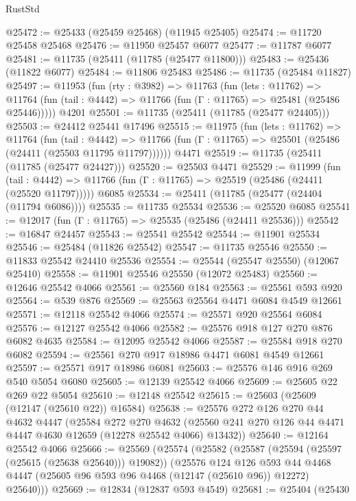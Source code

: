 \begin{lexlean}{RustStd}
\begin{coremodule}
@25472 := @25433 (@25459 @25468) (@11945 @25405)
@25474 := @11720 @25458 @25468
@25476 := @11950 @25457 @6077
@25477 := @11787 @6077
@25481 := @11735 (@25411 (@11785 (@25477 @11800)))
@25483 := @25436 (@11822 @6077)
@25484 := @11806 @25483
@25486 := @11735 (@25484 @11827)
@25497 := @11953
    (fun (rty : @3982) =>
    @11763
      (fun (lets : @11762) =>
      @11764 (fun (tail : @4442) => @11766 (fun (Γ : @11765) => @25481 (@25486 @25446)))))
    @4201
@25501 := @11735 (@25411 (@11785 (@25477 @24405)))
@25503 := @24412 @25441 @17496
@25515 := @11975
    (fun (lets : @11762) =>
    @11764
      (fun (tail : @4442) =>
      @11766 (fun (Γ : @11765) => @25501 (@25486 (@24411 (@25503 @11795 @11797))))))
    @4471
@25519 := @11735 (@25411 (@11785 (@25477 @24427)))
@25520 := @25503 @4471
@25529 := @11999
    (fun (tail : @4442) => @11766 (fun (Γ : @11765) => @25519 (@25486 (@24411 (@25520 @11797)))))
    @6085
@25534 := @25411 (@11785 (@25477 (@24404 (@11794 @6086))))
@25535 := @11735 @25534
@25536 := @25520 @6085
@25541 := @12017 (fun (Γ : @11765) => @25535 (@25486 (@24411 @25536)))
@25542 := @16847 @24457
@25543 := @25541 @25542
@25544 := @11901 @25534
@25546 := @25484 (@11826 @25542)
@25547 := @11735 @25546
@25550 := @11833 @25542 @24410 @25536
@25554 := @25544 (@25547 @25550) (@12067 @25410)
@25558 := @11901 @25546 @25550 (@12072 @25483)
@25560 := @12646 @25542 @4066
@25561 := @25560 @184
@25563 := @25561 @593 @920
@25564 := @539 @876
@25569 := @25563 @25564 @4471 @6084 @4549 @12661
@25571 := @12118 @25542 @4066
@25574 := @25571 @920 @25564 @6084
@25576 := @12127 @25542 @4066
@25582 := @25576 @918 @127 @270 @876 @6082 @4635
@25584 := @12095 @25542 @4066
@25587 := @25584 @918 @270 @6082
@25594 := @25561 @270 @917 @18986 @4471 @6081 @4549 @12661
@25597 := @25571 @917 @18986 @6081
@25603 := @25576 @146 @916 @269 @540 @5054 @6080
@25605 := @12139 @25542 @4066
@25609 := @25605 @22 @269 @22 @5054
@25610 := @12148 @25542
@25615 := @25603 (@25609 (@12147 (@25610 @22)) @16584)
@25638 := @25576
    @272
    @126
    @270
    @44
    @4632
    @4447
    (@25584
      @272
      @270
      @4632
      (@25560 @241 @270 @126 @44 @4471 @4447 @4630 @12659 (@12278 @25542 @4066) @13432))
@25640 := @12164 @25542 @4066
@25666 := @25569
    (@25574
      (@25582
        (@25587 (@25594 (@25597 (@25615 (@25638 @25640))) @19082))
        (@25576
          @124
          @126
          @593
          @44
          @4468
          @4447
          (@25605 @96 @593 @96 @4468 (@12147 (@25610 @96)) @12272)
          @25640)))
@25669 := @12834 (@12837 @593 @4549)
@25681 := @25404
    (@25430

\end{coremodule}
\end{lexlean}
